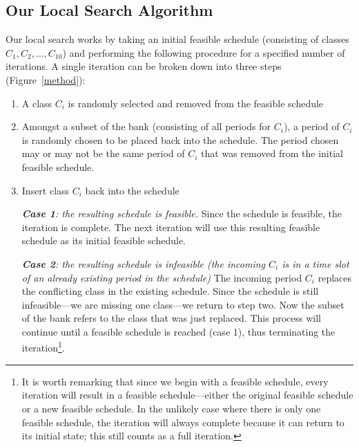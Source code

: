 \documentclass[11pt, oneside]{article}   	%
\begin{document}
\newpage

\subsection{Our Local Search Algorithm}

Our local search works by taking an initial feasible schedule (consisting of classes $C_1, C_2, \ldots , C_{10}$) and performing the following procedure for a specified number of iterations. A single iteration can be broken down into three steps (Figure~\ref{method}):

\begin{enumerate}

\item A class $C_i$ is randomly selected and removed from the feasible schedule
\item Amongst a subset of the bank (consisting of all periods for $C_i$), a period of $C_i$ is randomly chosen to be placed back into the schedule. The period chosen may or may not be the same period of $C_i$ that was removed from the initial feasible schedule.

\item Insert class $C_i$ back into the schedule

\textit{\textbf{Case 1}: the resulting schedule is feasible.} Since the schedule is feasible, the iteration is complete. The next iteration will use this resulting feasible schedule as its initial feasible schedule.

\textit{\textbf{Case 2}: the resulting schedule is infeasible (the incoming $C_i$ is in a time slot of an already existing period in the schedule)} The incoming period $C_i$ replaces the conflicting class in the existing schedule. Since the schedule is still infeasible---we are missing one class---we return to step two. Now the subset of the bank refers to the class that was just replaced. This process will continue until a feasible schedule is reached (case 1), thus terminating the iteration\footnote{It is worth remarking that since we begin with a feasible schedule, every iteration will result in a feasible schedule---either the original feasible schedule or a new feasible schedule. In the unlikely case where there is only one feasible schedule, the iteration will always complete because it can return to its initial state; this still counts as a full iteration.}.
\end{enumerate}
\end{document}
